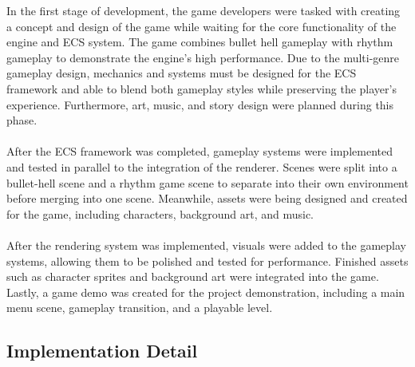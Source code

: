 In the first stage of development, the game developers were tasked with creating a concept and design of the game
while waiting for the core functionality of the engine and ECS system.
The game combines bullet hell gameplay with rhythm gameplay to demonstrate the engine's high performance.
Due to the multi-genre gameplay design, mechanics and systems must be designed for the ECS framework and able to
blend both gameplay styles while preserving the player's experience.
Furthermore, art, music, and story design were planned during this phase.
\\\\
After the ECS framework was completed, gameplay systems were implemented and tested in parallel to the integration
of the renderer.
Scenes were split into a bullet-hell scene and a rhythm game scene to separate into their own environment before
merging into one scene.
Meanwhile, assets were being designed and created for the game, including characters, background art, and music.
\\\\
After the rendering system was implemented, visuals were added to the gameplay systems, allowing them to be polished and
tested for performance.
Finished assets such as character sprites and background art were integrated into the game.
Lastly, a game demo was created for the project demonstration, including a main menu scene, gameplay transition, and a playable level.


\subsection{Implementation Detail}
\label{subsec:implementation-detail}



